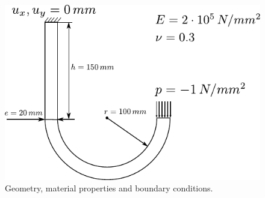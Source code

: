 \documentclass[12pt]{article}
\begin{document}
\vspace{2cm}

\begin{figure}[htp]
\begin{center}
\includegraphics[width=0.8\linewidth]{hook.pdf}
\caption{Geometry, material properties and boundary conditions.}
\label{fig:geometry}
\end{center}
\end{figure}

\vspace{2cm}

\hrulefill


\end{document}
